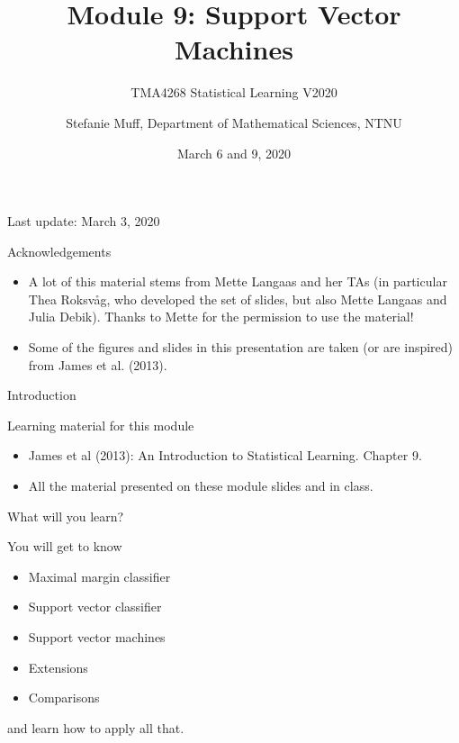 \documentclass[10pt,ignorenonframetext,]{beamer}
\title{Module 9: Support Vector Machines}
\subtitle{TMA4268 Statistical Learning V2020}
\author{Stefanie Muff, Department of Mathematical Sciences, NTNU}
\date{March 6 and 9, 2020}
\providecommand{\tightlist}{%
  \setlength{\itemsep}{0pt}\setlength{\parskip}{0pt}}
\begin{document}
\frame{\titlepage}

\begin{frame}

Last update: March 3, 2020

\end{frame}

\begin{frame}{Acknowledgements}
\protect\hypertarget{acknowledgements}{}

\begin{itemize}
\item
  A lot of this material stems from Mette Langaas and her TAs (in
  particular Thea Roksv\aa g, who developed the set of slides, but also
  Mette Langaas and Julia Debik). Thanks to Mette for the permission to
  use the material!
\item
  Some of the figures and slides in this presentation are taken (or are
  inspired) from James et al. (2013).
\end{itemize}

\end{frame}

\begin{frame}{Introduction}
\protect\hypertarget{introduction}{}

\begin{block}{Learning material for this module}

\vspace{2mm}

\begin{itemize}
\tightlist
\item
  James et al (2013): An Introduction to Statistical Learning. Chapter
  9.\\
\item
  All the material presented on these module slides and in class.
\end{itemize}

\end{block}

\end{frame}

\begin{frame}

\begin{block}{What will you learn?}

\vspace{2mm}

You will get to know

\begin{itemize}
\tightlist
\item
  Maximal margin classifier
\item
  Support vector classifier
\item
  Support vector machines
\item
  Extensions
\item
  Comparisons
\end{itemize}

and learn how to apply all that.

\end{block}

\end{frame}
\end{document}
